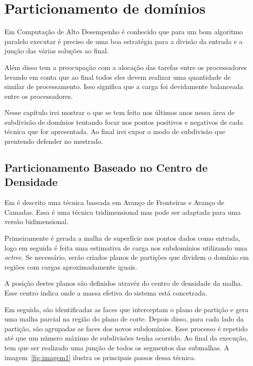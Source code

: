\pagestyle{empty}
\cleardoublepage
\pagestyle{fancy}
\chapter{Particionamento de domínios}\label{cap2}

Em Computação de Alto Desempenho é conhecido que para um bom algoritmo paralelo executar é preciso de uma boa estratégia para a divisão da entrada e a junção das várias soluções ao final. 

Além disso tem a preocupação com a alocação das tarefas entre os processadores levando em conta que ao final todos eles devem realizar uma quantidade de similar de processamento. Isso significa que a carga foi devidamente balanceada entre os processadores.

Nesse capítulo irei mostrar o que se tem feito nos últimos anos nessa área de subdivisão de domínios tentando focar nos pontos positivos e negativos de cada técnica que for apresentada. Ao final irei expor o modo de subdivisão que prentendo defender no mestrado.



\section{Particionamento Baseado no Centro de Densidade}

Em \cite{bib:Pirzadeh09} é descrito uma técnica baseada em Avanço de Fronteiras e Avanço de Camadas. Essa é uma técnica tridimensional mas pode ser adaptada para uma versão bidimensional.

Primeiramente é gerada a malha de superfície nos pontos dados como entrada, logo em seguida é feita uma estimativa de carga nos subdomínios utilizando uma \textit{octree}. Se necessário, serão criados planos de partições que dividem o domínio em regiões com cargas aproximadamente iguais. 

A posição destes planos são definidos atravéz do centro de densidade da malha. Esse centro indica onde a massa efetiva do sistema está concetrada.

Em seguida, são identificadas as faces que interceptam o plano de partição e gera uma malha parcial na região do plano de corte. Depois disso, para cada lado da partição, são agrupadas as faces dos novos subdomínios. Esse processo é repetido até que um número máximo de subdivisões tenha ocorrido. Ao final da execução, tem que ser realizado uma junção de todos os segmentos das submalhas. A imagem~\ref{fig:imagem1} ilustra os principais passos dessa técnica.


